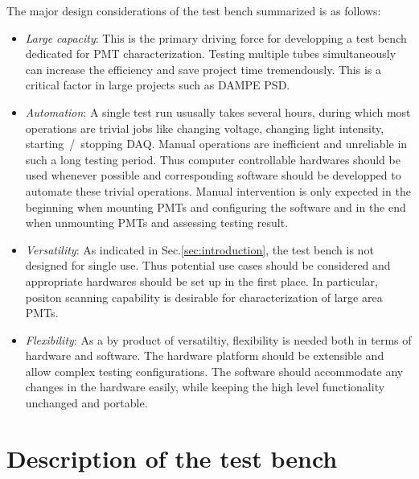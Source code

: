 \documentclass[5p, times]{elsarticle}
\begin{document}
The major design considerations of the test bench summarized is as follows:
\begin{itemize}
 \item \textit{Large capacity}: This is the primary driving force for developping a test bench dedicated for PMT characterization.
 Testing multiple tubes simultaneously can increase the efficiency and save project time tremendously.
 This is a critical factor in large projects such as DAMPE PSD.
 \item \textit{Automation}: A single test run ususally takes several hours, during which most operations are trivial jobs like changing voltage, changing light intensity, starting~/~stopping DAQ.
 Manual operations are inefficient and unreliable in such a long testing period.
 Thus computer controllable hardwares should be used whenever possible and corresponding software should be developped to automate these trivial operations.
 Manual intervention is only expected in the beginning when mounting PMTs and configuring the software and in the end when unmounting PMTs and assessing testing result. 
 \item \textit{Versatility}: As indicated in Sec.\ref{sec:introduction}, the test bench is not designed for single use.
 T\-h\-u\-s potential use cases should be considered and appropriate hardwares should be set up in the first place.
 In particular, positon scanning capability is desirable for characterization of large area PMTs. 
 \item \textit{Flexibility}: As a by product of versatiltiy, flexibility is needed both in terms of hardware and software.
 The hardware platform should be extensible and allow complex testing configurations.
 The software should accommodate any changes in the hardware easily, while keeping the high level functionality unchanged and portable. 
\end{itemize}

\section{Description of the test bench}
\label{sec:description}
\end{document}
